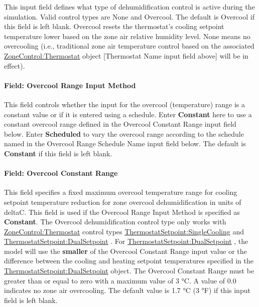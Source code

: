 This input field defines what type of dehumidification control is active during the simulation. Valid control types are None and Overcool. The default is Overcool if this field is left blank. Overcool resets the thermostat's cooling setpoint temperature lower based on the zone air relative humidity level. None means no overcooling (i.e., traditional zone air temperature control based on the associated \hyperref[zonecontrolthermostat]{ZoneControl:Thermostat} object {[}Thermostat Name input field above{]} will be in effect).

\paragraph{Field: Overcool Range Input Method}\label{field-overcool-range-input-method}

This field controls whether the input for the overcool (temperature) range is a constant value or if it is entered using a schedule. Enter \textbf{Constant} here to use a constant overcool range defined in the Overcool Constant Range input field below. Enter \textbf{Scheduled} to vary the overcool range according to the schedule named in the Overcool Range Schedule Name input field below. The default is \textbf{Constant} if this field is left blank.

\paragraph{Field: Overcool Constant Range}\label{field-overcool-constant-range}

This field specifies a fixed maximum overcool temperature range for cooling setpoint temperature reduction for zone overcool dehumidification in units of deltaC. This field is used if the Overcool Range Input Method is specified as \textbf{Constant}. The Overcool dehumidification control type only works with \hyperref[zonecontrolthermostat]{ZoneControl:Thermostat} control types \hyperref[thermostatsetpointsinglecooling]{ThermostatSetpoint:SingleCooling} and \hyperref[thermostatsetpointdualsetpoint]{ThermostatSetpoint:DualSetpoint} . For \hyperref[thermostatsetpointdualsetpoint]{ThermostatSetpoint:DualSetpoint} , the model will use the \textbf{smaller} of the Overcool Constant Range input value or the difference between the cooling and heating setpoint temperatures specified in the \hyperref[thermostatsetpointdualsetpoint]{ThermostatSetpoint:DualSetpoint} object. The Overcool Constant Range must be greater than or equal to zero with a maximum value of 3 °C. A value of 0.0 indicates no zone air overcooling. The default value is 1.7 °C (3 °F) if this input field is left blank.

